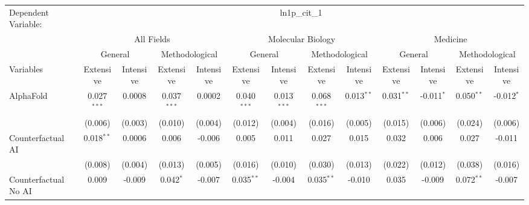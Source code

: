 \begingroup
\centering
\begin{tabular}{lcccccccccccc}
   \tabularnewline \midrule \midrule
   Dependent Variable: & \multicolumn{12}{c}{ln1p\_cit\_1}\\
 & \multicolumn{4}{c}{All Fields} & \multicolumn{4}{c}{Molecular Biology} & \multicolumn{4}{c}{Medicine} \\
\cmidrule(lr){2-5} \cmidrule(lr){6-9} \cmidrule(lr){10-13}
 & \multicolumn{2}{c}{General} & \multicolumn{2}{c}{Methodological} & \multicolumn{2}{c}{General} & \multicolumn{2}{c}{Methodological} & \multicolumn{2}{c}{General} & \multicolumn{2}{c}{Methodological} \\
\cmidrule(lr){2-3} \cmidrule(lr){4-5} \cmidrule(lr){6-7} \cmidrule(lr){8-9} \cmidrule(lr){10-11} \cmidrule(lr){12-13}
Variables & \multicolumn{1}{c}{Extensive} & \multicolumn{1}{c}{Intensive} & \multicolumn{1}{c}{Extensive} & \multicolumn{1}{c}{Intensive} & \multicolumn{1}{c}{Extensive} & \multicolumn{1}{c}{Intensive} & \multicolumn{1}{c}{Extensive} & \multicolumn{1}{c}{Intensive} & \multicolumn{1}{c}{Extensive} & \multicolumn{1}{c}{Intensive} & \multicolumn{1}{c}{Extensive} & \multicolumn{1}{c}{Intensive} \\
\cmidrule(lr){1-1}\cmidrule(lr){2-2} \cmidrule(lr){3-3} \cmidrule(lr){4-4} \cmidrule(lr){5-5} \cmidrule(lr){6-6} \cmidrule(lr){7-7} \cmidrule(lr){8-8} \cmidrule(lr){9-9} \cmidrule(lr){10-10} \cmidrule(lr){11-11} \cmidrule(lr){12-12} \cmidrule(lr){13-13}
   AlphaFold                                & 0.027$^{***}$ & 0.0008    & 0.037$^{***}$  & 0.0002   & 0.040$^{***}$ & 0.013$^{***}$   & 0.068$^{***}$  & 0.013$^{**}$ & 0.031$^{**}$   & -0.011$^{*}$ & 0.050$^{**}$  & -0.012$^{*}$\\   
                                            & (0.006)       & (0.003)   & (0.010)        & (0.004)  & (0.012)       & (0.004)         & (0.016)        & (0.005)      & (0.015)        & (0.006)      & (0.024)       & (0.006)\\   
   Counterfactual AI                        & 0.018$^{**}$  & 0.0006    & 0.006          & -0.006   & 0.005         & 0.011           & 0.027          & 0.015        & 0.032          & 0.006        & 0.027         & -0.011\\   
                                            & (0.008)       & (0.004)   & (0.013)        & (0.005)  & (0.016)       & (0.010)         & (0.030)        & (0.013)      & (0.022)        & (0.012)      & (0.038)       & (0.016)\\   
   Counterfactual No AI                     & 0.009         & -0.009    & 0.042$^{*}$    & -0.007   & 0.035$^{**}$  & -0.004          & 0.035$^{**}$   & -0.010       & 0.035          & -0.009       & 0.072$^{**}$  & -0.007\\   

\end{tabular}
